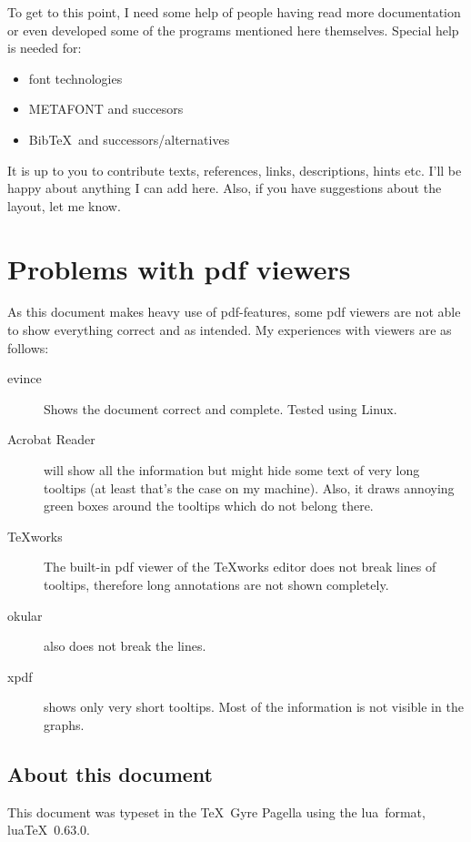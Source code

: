 \documentclass[
%
]{scrartcl}
\begin{document}
To get to this point, I need some help of people having read more documentation or even developed some of the programs mentioned here themselves. Special help is needed for:
\begin{itemize}
\item font technologies
\item METAFONT and succesors
\item Bib\TeX\ and successors/alternatives
\end{itemize}

It is up to you to contribute texts, references, links, descriptions, hints etc. I'll be happy about anything I can add here. Also, if you have suggestions about the layout, let me know.

\section{Problems with pdf viewers}
As this document makes heavy use of pdf-features, some pdf viewers are not able to show everything correct and as intended. My experiences with viewers are as follows:

\begin{description}
\item[evince] Shows the document correct and complete. Tested using Linux.

\item[Acrobat Reader] will show all the information but might hide some text of very long tooltips (at least that's the case on my machine). Also, it draws annoying green boxes around the tooltips which do not belong there.

\item[TeXworks] The built-in pdf viewer of the TeXworks editor does not break lines of tooltips, therefore long annotations are not shown completely.

\item[okular] also does not break the lines.

\item[xpdf] shows only very short tooltips. Most of the information is not visible in the graphs.
\end{description}

\subsection*{About this document}
This document was typeset in the \TeX\ Gyre Pagella using the lua\LaTeXe\ format, lua\TeX\ 0.63.0.
\end{document}

